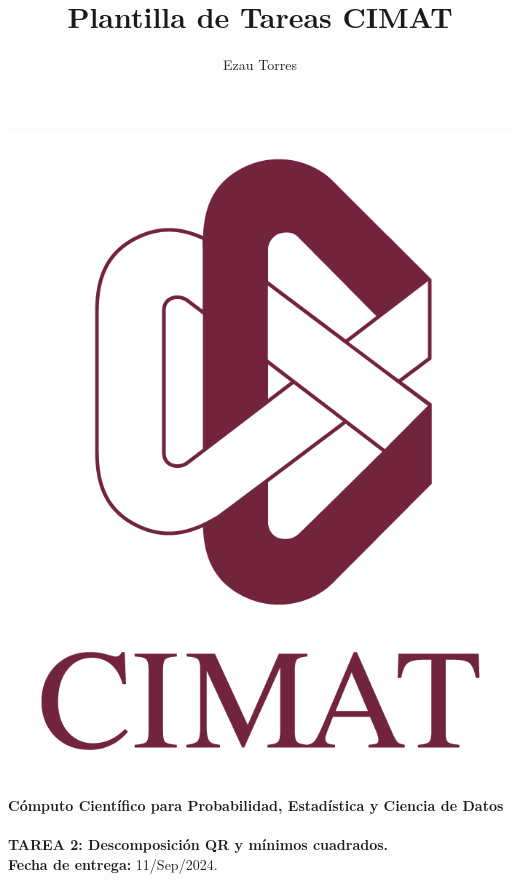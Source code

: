 \documentclass[a4paper,12pt]{report}
\title{Plantilla de Tareas CIMAT}
\author{Ezau Torres}
\begin{document}
	\begin{minipage}{0.15\textwidth}
		\centering
		\includegraphics[width=\textwidth]{IMAGENES/logo}
	\end{minipage}
	\begin{minipage}{0.85\textwidth}
		\centering
		\textbf{\large Cómputo Científico para Probabilidad, Estadística y Ciencia de Datos}\\
		\medskip
		 \\
		\medskip
		\textbf{\large TAREA 2: Descomposición QR y mínimos cuadrados.}\\
		\medskip
		\textbf{Fecha de entrega:} 11/Sep/2024.
	\end{minipage}

\vspace{5mm}



\end{document}
